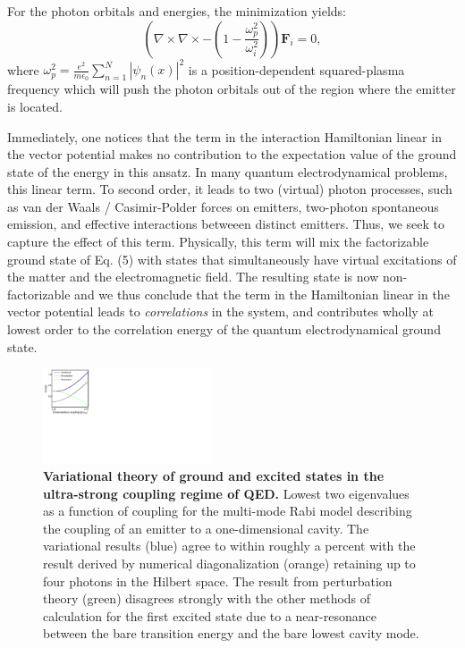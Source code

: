 \documentclass[aps,prl,twocolumn,
	groupedaddress,superscriptaddress,
	amsfonts,amssymb,amsmath,floatfix,
	citeautoscript]{revtex4-1}
\begin{document}
For the photon orbitals and energies, the minimization yields:
\begin{equation}
\left( \nabla\times\nabla\times - \left(1-\frac{\omega_p^2}{\omega_i^2} \right)\right)\mathbf{F}_i = 0,
\end{equation}
where $\omega_p^2 = \frac{e^2}{m\epsilon_0}\sum\limits_{n=1}^N |\psi_n(x)|^2$ is a position-dependent squared-plasma frequency which will push the photon orbitals out of the region where the emitter is located.

Immediately, one notices that the term in the interaction Hamiltonian linear in the vector potential makes no contribution to the expectation value of the ground state of the energy in this ansatz. In many quantum electrodynamical problems, this linear term. To second order, it leads to two (virtual) photon processes, such as van der Waals / Casimir-Polder forces on emitters, two-photon spontaneous emission, and effective interactions betweeen distinct emitters. Thus, we seek to capture the effect of this term. Physically, this term will mix the factorizable ground state of Eq. (5) with states that simultaneously have virtual excitations of the matter and the electromagnetic field. The resulting state is now non-factorizable and we thus conclude that the term in the Hamiltonian linear in the vector potential leads to \textit{correlations} in the system, and contributes wholly at lowest order to the correlation energy of the quantum electrodynamical ground state.
\begin{figure}[t]
\includegraphics[width=5cm]{figure2new.pdf}
\caption{\textbf{Variational theory of ground and excited states in the ultra-strong coupling regime of QED.} Lowest two eigenvalues as a function of coupling for the multi-mode Rabi model describing the coupling of an emitter to a one-dimensional cavity. The variational results (blue) agree to within roughly a percent with the result derived by numerical diagonalization (orange) retaining up to four photons in the Hilbert space. The result from perturbation theory (green) disagrees strongly with the other methods of calculation for the first excited state due to a near-resonance between the bare transition energy and the bare lowest cavity mode.}
\label{fig:ansatz}
\end{figure}
\end{document}
